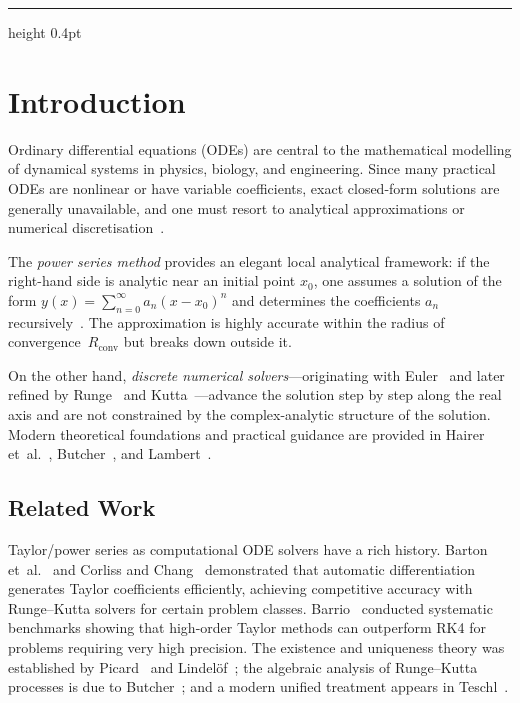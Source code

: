 \documentclass[12pt,a4paper]{article}
\theoremstyle{definition}
\theoremstyle{remark}
\newcommand{\Rconv}{R_{\mathrm{conv}}}
\begin{document}
\vspace{6pt}
\hrule height 0.4pt
\vspace{10pt}

\tableofcontents
\newpage

\section{Introduction}
\label{sec:intro}

Ordinary differential equations (ODEs) are central to the
mathematical modelling of dynamical systems in physics, biology, and
engineering.  Since many practical ODEs are nonlinear or have
variable coefficients, exact closed-form solutions are generally
unavailable, and one must resort to analytical approximations or
numerical discretisation~\cite{boyce2017,coddington1955}.

The \emph{power series method} provides an elegant local analytical
framework: if the right-hand side is analytic near an initial point
$x_0$, one assumes a solution of the form
$y(x) = \sum_{n=0}^{\infty} a_n (x - x_0)^n$ and determines the
coefficients $a_n$ recursively~\cite{boyce2017}.  The approximation
is highly accurate within the radius of convergence~$\Rconv$ but
breaks down outside it.

On the other hand, \emph{discrete numerical solvers}---originating
with Euler~\cite{euler1768} and later refined by Runge~\cite{runge1895}
and Kutta~\cite{kutta1901}---advance the solution step by step along
the real axis and are not constrained by the complex-analytic
structure of the solution.  Modern theoretical foundations and
practical guidance are provided in Hairer et~al.~\cite{hairer1993},
Butcher~\cite{butcher2016}, and Lambert~\cite{lambert1991}.

\subsection{Related Work}

Taylor/power series as computational ODE solvers have a rich
history.  Barton et~al.~\cite{barton1971} and Corliss and Chang~\cite{corliss1982} demonstrated that
automatic differentiation generates Taylor coefficients efficiently,
achieving competitive accuracy with Runge--Kutta solvers for certain
problem classes.  Barrio~\cite{barrio2005} conducted systematic
benchmarks showing that high-order Taylor methods can outperform RK4
for problems requiring very high precision.  The existence and
uniqueness theory was established by Picard~\cite{picard1890} and
Lindelöf~\cite{lindelof1894}; the algebraic analysis of Runge--Kutta
processes is due to Butcher~\cite{butcher1963,butcher1964}; and a
modern unified treatment appears in Teschl~\cite{teschl2012}.
\end{document}
